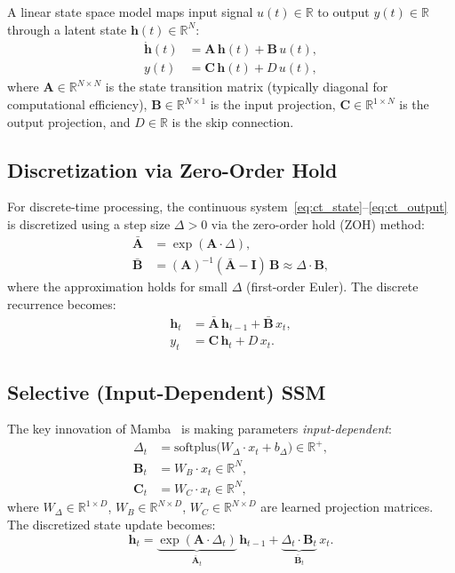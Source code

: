 \documentclass[journal]{IEEEtran}
\begin{document}
A linear state space model maps input signal $u(t) \in \mathbb{R}$ to output $y(t) \in \mathbb{R}$ through a latent state $\mathbf{h}(t) \in \mathbb{R}^N$:
\begin{align}
\dot{\mathbf{h}}(t) &= \mathbf{A}\,\mathbf{h}(t) + \mathbf{B}\,u(t), \label{eq:ct_state}\\
y(t) &= \mathbf{C}\,\mathbf{h}(t) + D\,u(t), \label{eq:ct_output}
\end{align}
where $\mathbf{A} \in \mathbb{R}^{N \times N}$ is the state transition matrix (typically diagonal for computational efficiency), $\mathbf{B} \in \mathbb{R}^{N \times 1}$ is the input projection, $\mathbf{C} \in \mathbb{R}^{1 \times N}$ is the output projection, and $D \in \mathbb{R}$ is the skip connection.

\subsection{Discretization via Zero-Order Hold}

For discrete-time processing, the continuous system~\eqref{eq:ct_state}--\eqref{eq:ct_output} is discretized using a step size $\Delta > 0$ via the zero-order hold (ZOH) method:
\begin{align}
\bar{\mathbf{A}} &= \exp(\mathbf{A} \cdot \Delta), \label{eq:zoh_A}\\
\bar{\mathbf{B}} &= (\mathbf{A})^{-1}(\bar{\mathbf{A}} - \mathbf{I})\,\mathbf{B} \approx \Delta \cdot \mathbf{B}, \label{eq:zoh_B}
\end{align}
where the approximation holds for small $\Delta$ (first-order Euler).
The discrete recurrence becomes:
\begin{align}
\mathbf{h}_t &= \bar{\mathbf{A}}\,\mathbf{h}_{t-1} + \bar{\mathbf{B}}\,x_t, \label{eq:dt_state}\\
y_t &= \mathbf{C}\,\mathbf{h}_t + D\,x_t. \label{eq:dt_output}
\end{align}

\subsection{Selective (Input-Dependent) SSM}
\label{sec:selective_def}

The key innovation of Mamba~\cite{gu2024mamba} is making parameters \emph{input-dependent}:
\begin{align}
\Delta_t &= \text{softplus}\big(W_\Delta \cdot x_t + b_\Delta\big) \in \mathbb{R}^+, \label{eq:dt_proj}\\
\mathbf{B}_t &= W_B \cdot x_t \in \mathbb{R}^N, \label{eq:B_proj}\\
\mathbf{C}_t &= W_C \cdot x_t \in \mathbb{R}^N, \label{eq:C_proj}
\end{align}
where $W_\Delta \in \mathbb{R}^{1 \times D}$, $W_B \in \mathbb{R}^{N \times D}$, $W_C \in \mathbb{R}^{N \times D}$ are learned projection matrices.
The discretized state update becomes:
\begin{equation}
\mathbf{h}_t = \underbrace{\exp(\mathbf{A} \cdot \Delta_t)}_{\bar{\mathbf{A}}_t}\,\mathbf{h}_{t-1} + \underbrace{\Delta_t \cdot \mathbf{B}_t}_{\bar{\mathbf{B}}_t}\,x_t.
\label{eq:selective_update}
\end{equation}
\end{document}
